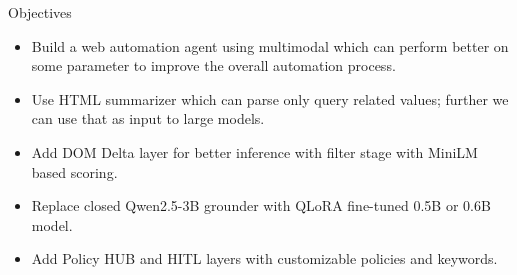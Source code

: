 \begin{frame}{Objectives}
  \begin{itemize}
    \item Build a web automation agent using multimodal which can perform better on some parameter to improve the overall automation process.
    \item Use HTML summarizer which can parse only query related values; further we can use that as input to large models.
    \item Add DOM Delta layer for better inference with filter stage with MiniLM based scoring.
    \item Replace closed Qwen2.5-3B grounder with QLoRA fine-tuned 0.5B or 0.6B model.
    \item Add Policy HUB and HITL layers with customizable policies and keywords.
  \end{itemize}
\end{frame}
